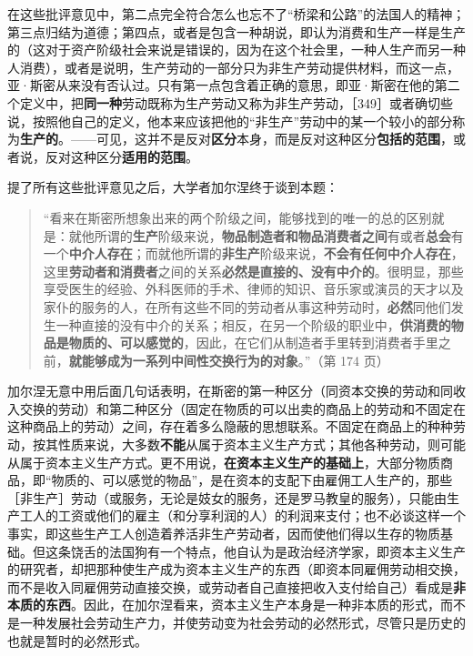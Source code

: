 在这些批评意见中，第二点完全符合怎么也忘不了“桥梁和公路”的法国人的精神；第三点归结为道德；第四点，或者是包含一种胡说，即认为消费和生产一样是生产的（这对于资产阶级社会来说是错误的，因为在这个社会里，一种人生产而另一种人消费），或者是说明，生产劳动的一部分只为非生产劳动提供材料，而这一点，亚·斯密从来没有否认过。只有第一点包含着正确的意思，即亚·斯密在他的第二个定义中，把\textbf{同一种}劳动既称为生产劳动又称为非生产劳动，［349］或者确切些说，按照他自己的定义，他本来应该把他的“非生产”劳动中的某一个较小的部分称为\textbf{生产的}。——可见，这并不是反对\textbf{区分}本身，而是反对这种区分\textbf{包括的范围}，或者说，反对这种区分\textbf{适用的范围}。

提了所有这些批评意见之后，大学者加尔涅终于谈到本题：

\begin{quote}“看来在斯密所想象出来的两个阶级之间，能够找到的唯一的总的区别就是：就他所谓的\textbf{生产}阶级来说，\textbf{物品制造者和物品消费者之间}有或者\textbf{总会}有一个\textbf{中介人存在}；而就他所谓的\textbf{非生产}阶级来说，\textbf{不会有任何中介人存在}，这里\textbf{劳动者和消费者}之间的关系\textbf{必然是直接的、没有中介的}。很明显，那些享受医生的经验、外科医师的手术、律师的知识、音乐家或演员的天才以及家仆的服务的人，在所有这些不同的劳动者从事这种劳动时，\textbf{必然}同他们发生一种直接的没有中介的关系；相反，在另一个阶级的职业中，\textbf{供消费的物品是物质的、可以感觉的}，因此，在它们从制造者手里转到消费者手里之前，\textbf{就能够成为一系列中间性交换行为的对象}。”（第 174 页）\end{quote}

加尔涅无意中用后面几句话表明，在斯密的第一种区分（同资本交换的劳动和同收入交换的劳动）和第二种区分（固定在物质的可以出卖的商品上的劳动和不固定在这种商品上的劳动）之间，存在着多么隐蔽的思想联系。不固定在商品上的种种劳动，按其性质来说，大多数\textbf{不能}从属于资本主义生产方式；其他各种劳动，则可能从属于资本主义生产方式。更不用说，\textbf{在资本主义生产的基础上}，大部分物质商品，即“物质的、可以感觉的物品”，是在资本的支配下由雇佣工人生产的，那些［非生产］劳动（或服务，无论是妓女的服务，还是罗马教皇的服务），只能由生产工人的工资或他们的雇主（和分享利润的人）的利润来支付；也不必谈这样一个事实，即这些生产工人创造着养活非生产劳动者，因而使他们得以生存的物质基础。但这条饶舌的法国狗有一个特点，他自认为是政治经济学家，即资本主义生产的研究者，却把那种使生产成为资本主义生产的东西（即资本同雇佣劳动相交换，而不是收入同雇佣劳动直接交换，或劳动者自己直接把收入支付给自己）看成是\textbf{非本质的东西}。因此，在加尔涅看来，资本主义生产本身是一种非本质的形式，而不是一种发展社会劳动生产力，并使劳动变为社会劳动的必然形式，尽管只是历史的也就是暂时的必然形式。

